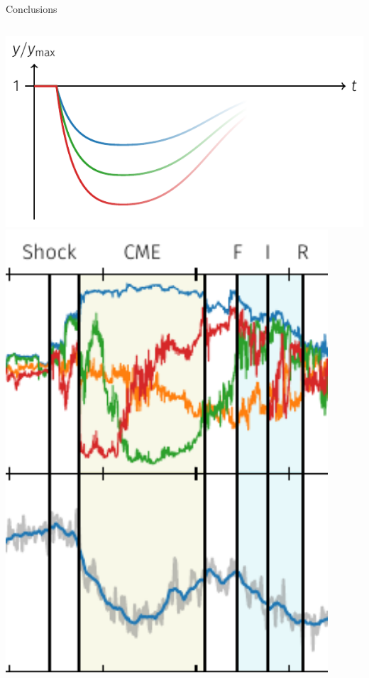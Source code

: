 \documentclass[10pt,aspectratio=169,usenames,dvipsnames]{beamer}
\begin{document}
\begin{frame}{Conclusions}
\begin{columns}[T]
\begin{column}{0.1\textwidth}
            \includegraphics[width=\textwidth]{images/summary_pics/05_expand.PNG}\\[2mm]
            \includegraphics[width=0.9\textwidth]{images/summary_pics/06_solo.PNG}
        \end{column}
    \end{columns}
\end{frame}
\end{document}
